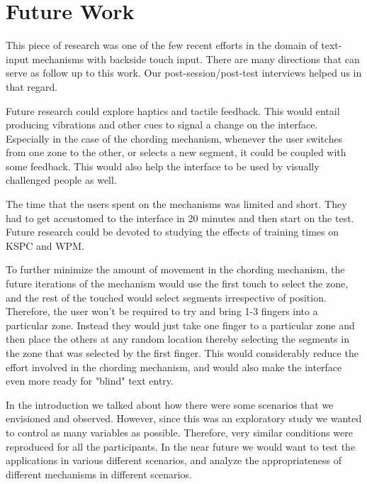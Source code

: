 \section{Future Work}

This piece of research was one of the few recent efforts in the domain
of text-input mechanisms with backside touch input. There are many
directions that can serve as follow up to this work. Our post-session/post-test interviews helped us in that regard. 

Future research could explore haptics and tactile feedback. This would entail producing vibrations and other cues to signal a change on the interface. Especially in the case of the chording mechanism, whenever the user switches from one zone to the other, or selects a new segment, it could be coupled with some feedback. This would also help the interface to be used by visually challenged people as well.

The time that the users spent on the mechanisms was limited and short. They had to get accustomed to the interface in 20 minutes and then start on the test. Future research could be devoted to studying the effects of training times on KSPC and WPM. 

To further minimize the amount of movement in the chording mechanism, the future iterations of the mechanism would use the first touch to select the zone, and the rest of the touched would select segments irrespective of position. Therefore, the user won't be required to try and bring 1-3 fingers into a particular zone. Instead they would just take one finger to a particular zone and then place the others at any random location thereby selecting the segments in the zone that was selected by the first finger. This would considerably reduce the effort involved in the chording mechanism, and would also make the interface even more ready for "blind" text entry.

In the introduction we talked about how there were some scenarios that we envisioned and observed. However, since this was an exploratory study we wanted to control as many variables as possible. Therefore, very similar conditions were reproduced for all the participants. In the near future we would want to test the applications in various different scenarios, and analyze the appropriateness of different mechanisms in different scenarios.
